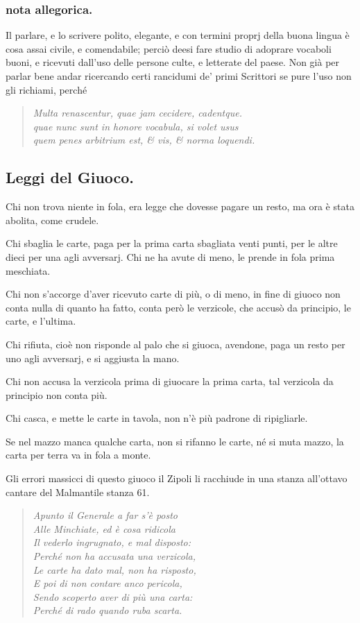 \documentclass[11pt,a6paper]{article}
\newcommand{\literaryquote}[1]{%
\kern -6pt  \begin{verse}
    {\footnotesize \it #1}
  \end{verse}\kern -2pt%
}
\begin{document}
\subsubsection{nota allegorica.}
{\footnotesize
Il parlare, e lo scrivere polito, elegante, e con
termini proprj della buona lingua è cosa assai civile,
e comendabile; perciò deesi fare studio di adoprare
vocaboli buoni, e ricevuti dall'uso delle persone
culte, e letterate del paese. Non già per parlar
bene andar ricercando certi rancidumi de' primi Scrittori
se pure l'uso non gli richiami, perché
\literaryquote{
Multa renascentur, quae jam cecidere, cadentque.\\
quae nunc sunt in honore vocabula, si volet usus\\
quem penes arbitrium est, \& vis, \& norma loquendi.}
}
\subsection{Leggi del Giuoco.}

Chi non trova niente in fola, era legge
che dovesse pagare un resto, ma ora è
stata abolita, come crudele.

Chi sbaglia le carte, paga per la prima
carta sbagliata venti punti, per le altre dieci
per una agli avversarj. Chi ne ha avute di
meno, le prende in fola prima meschiata.

Chi non s'accorge d'aver ricevuto carte
di più, o di meno, in fine di giuoco non conta
nulla di quanto ha fatto, conta però le verzicole,
che accusò da principio, le carte, e
l'ultima.

Chi rifiuta, cioè non risponde al palo
che si giuoca, avendone, paga un resto per
uno agli avversarj, e si aggiusta la mano.

Chi non accusa la verzicola prima di
giuocare la prima carta, tal verzicola da
principio non conta più.

Chi casca, e mette le carte in tavola,
non n'è più padrone di ripigliarle.

Se nel mazzo manca qualche carta, non si
rifanno le carte, né si muta mazzo, la carta
per terra va in fola a monte.

Gli errori massicci di questo giuoco il Zipoli
li racchiude in una stanza all'ottavo cantare
del Malmantile stanza 61.

\literaryquote{\normalsize Apunto il Generale a far s'è posto\\
Alle Minchiate, ed è cosa ridicola\\
Il vederlo ingrugnato, e mal disposto:\\
Perché non ha accusata una verzicola,\\
 Le carte ha dato mal, non ha risposto,\\
E poi di non contare anco pericola,\\
Sendo scoperto aver di più una carta:\\
Perché di rado quando ruba scarta.}
\end{document}
